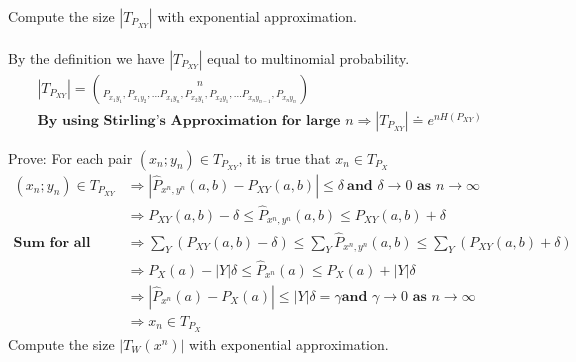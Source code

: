 \documentclass[
  course = {{EE623 Information Theory}},
  quartile = {{Fall 2020}},
  assignment = 10,
  name = {{Mohammad Mahdi Rahimi}},
  studentnumber = {{20208244}},
  email = {{mahi@kaist.ac.kr}},
  firstexercise = 1
]{aga-homework}
\begin{document}
\exercise
\subexercise Compute the size $|T_{P_{XY}}|$ with exponential approximation.
\\\\
By the definition we have $|T_{P_{XY}}|$ equal to multinomial probability.
\begin{equation} \label{eq1}
\begin{split}
|T_{P_{XY}}| = \binom{n}{P_{x_1y_1}, P_{x_1y_2}, ... P_{x_1y_n}, P_{x_2y_1}, P_{x_2y_1}, ...P_{x_ny_{n-1}}, P_{x_ny_n}}\\
\textbf{By using Stirling's Approximation for large } n \Rightarrow |T_{P_{XY}}| \doteq e^{nH(P_{XY})}
\end{split}
\end{equation}

\subexercise Prove: For each pair $(x_n; y_n) \in T_{P_{XY}}$, it is true that $x_n \in T_{P_X}$
\begin{equation} \label{eq2}
\begin{split}
(x_n; y_n) \in T_{P_{XY}} & \Rightarrow \left| \hat{P}_{x^n, y^n}(a,b) - P_{XY}(a,b)\right| \le \delta\ \textbf{and $\delta \rightarrow 0$ as $n \rightarrow \infty$}\\
& \Rightarrow P_{XY}(a,b) - \delta \le \hat{P}_{x^n, y^n}(a,b) \le P_{XY}(a,b) + \delta\\
\textbf{Sum for all possible Y to get X marginal} & \Rightarrow \sum_Y (P_{XY}(a,b) - \delta) \le \sum_Y \hat{P}_{x^n, y^n}(a,b) \le \sum_Y (P_{XY}(a,b) + \delta)\\
& \Rightarrow P_{X}(a) - |Y|\delta \le \hat{P}_{x^n}(a) \le P_{X}(a) + |Y|\delta\\
& \Rightarrow \left| \hat{P}_{x^n}(a) - P_{X}(a)\right| \le |Y|\delta = \gamma \textbf{and $\gamma \rightarrow 0$ as $n \rightarrow \infty$}\\
& \Rightarrow x_n \in T_{P_{X}}
\end{split}
\end{equation}
\subexercise Compute the size $|T_W(x^n)|$ with exponential approximation.
\end{document}

